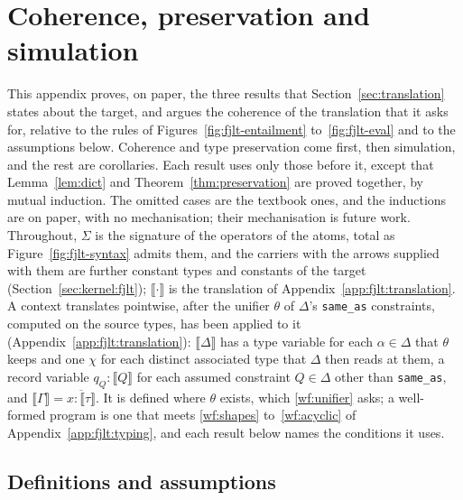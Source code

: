 \section{Coherence, preservation and simulation}
\label{app:fjlt:theorems}

This appendix proves, on paper, the three results that Section~\ref{sec:translation} states about the target, and argues the coherence of the translation that it asks for, relative to the rules of Figures~\ref{fig:fjlt-entailment} to~\ref{fig:fjlt-eval} and to the assumptions below.
Coherence and type preservation come first, then simulation, and the rest are corollaries.
Each result uses only those before it, except that Lemma~\ref{lem:dict} and Theorem~\ref{thm:preservation} are proved together, by mutual induction.
The omitted cases are the textbook ones, and the inductions are on paper, with no mechanisation; their mechanisation is future work.
Throughout, $\Sigma$ is the signature of the operators of the atoms, total as Figure~\ref{fig:fjlt-syntax} admits them, and the carriers with the arrows supplied with them are further constant types and constants of the target (Section~\ref{sec:kernel:fjlt}); $\llbracket \cdot \rrbracket$ is the translation of Appendix~\ref{app:fjlt:translation}.
A context translates pointwise, after the unifier $\theta$ of $\Delta$'s \texttt{same\_as} constraints, computed on the source types, has been applied to it (Appendix~\ref{app:fjlt:translation}): $\llbracket \Delta \rrbracket$ has a type variable for each $\alpha \in \Delta$ that $\theta$ keeps and one $\chi$ for each distinct associated type that $\Delta$ then reads at them, a record variable $q_Q : \llbracket Q \rrbracket$ for each assumed constraint $Q \in \Delta$ other than \texttt{same\_as}, and $\llbracket \Gamma \rrbracket = \overline{x : \llbracket \tau \rrbracket}$.
It is defined where $\theta$ exists, which \ref{wf:unifier} asks; a well-formed program is one that meets \ref{wf:shapes} to~\ref{wf:acyclic} of Appendix~\ref{app:fjlt:typing}, and each result below names the conditions it uses.

\subsection{Definitions and assumptions}

